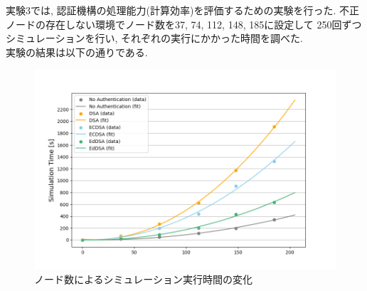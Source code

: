 \indent 実験3では, 認証機構の処理能力(計算効率)を評価するための実験を行った. 
不正ノードの存在しない環境でノード数を37, 74, 112, 148, 185に設定して
250回ずつシミュレーションを行い, それぞれの実行にかかった時間を調べた.\\
\indent 実験の結果は以下の通りである. 

\begin{figure}
  \centering
  \includegraphics[width=1\textwidth]{figures/exp3_simtime.png}
  \caption{ノード数によるシミュレーション実行時間の変化}
  \label{fig:exp3_simtime}
\end{figure}
\clearpage
\setlength{\tabcolsep}{4pt}
